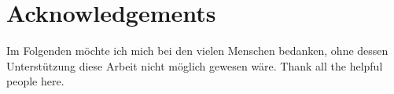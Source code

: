 \chapter*{Acknowledgements}

Im Folgenden möchte ich mich bei den vielen Menschen bedanken, ohne dessen Unterst\"utzung diese Arbeit nicht m\"oglich gewesen w\"are.
\vskip 0.2cm
%
Thank all the helpful people here.


